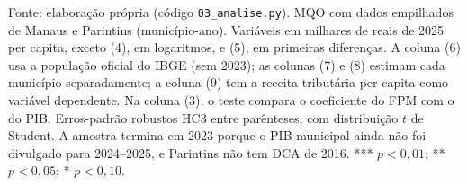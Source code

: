 \begin{table}[htbp]
\begin{minipage}{0.98\textwidth}
Fonte: elaboração própria (código \texttt{03\_analise.py}). MQO com dados empilhados de Manaus e Parintins (município-ano). Variáveis em milhares de reais de 2025 per capita, exceto (4), em logaritmos, e (5), em primeiras diferenças. A coluna (6) usa a população oficial do IBGE (sem 2023); as colunas (7) e (8) estimam cada município separadamente; a coluna (9) tem a receita tributária per capita como variável dependente. Na coluna (3), o teste compara o coeficiente do FPM com o do PIB. Erros-padrão robustos HC3 entre parênteses, com distribuição $t$ de Student. A amostra termina em 2023 porque o PIB municipal ainda não foi divulgado para 2024--2025, e Parintins não tem DCA de 2016. *** $p<0{,}01$; ** $p<0{,}05$; * $p<0{,}10$.
\end{minipage}
\end{table}
